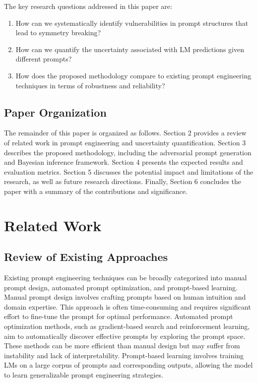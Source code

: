 \documentclass{article}
\begin{document}
The key research questions addressed in this paper are:

\begin{enumerate}
    \item How can we systematically identify vulnerabilities in prompt structures that lead to symmetry breaking?
    \item How can we quantify the uncertainty associated with LM predictions given different prompts?
    \item How does the proposed methodology compare to existing prompt engineering techniques in terms of robustness and reliability?
\end{enumerate}

\subsection{Paper Organization}
The remainder of this paper is organized as follows. Section 2 provides a review of related work in prompt engineering and uncertainty quantification. Section 3 describes the proposed methodology, including the adversarial prompt generation and Bayesian inference framework. Section 4 presents the expected results and evaluation metrics. Section 5 discusses the potential impact and limitations of the research, as well as future research directions. Finally, Section 6 concludes the paper with a summary of the contributions and significance.

\section{Related Work}

\subsection{Review of Existing Approaches}
Existing prompt engineering techniques can be broadly categorized into manual prompt design, automated prompt optimization, and prompt-based learning. Manual prompt design involves crafting prompts based on human intuition and domain expertise. This approach is often time-consuming and requires significant effort to fine-tune the prompt for optimal performance. Automated prompt optimization methods, such as gradient-based search and reinforcement learning, aim to automatically discover effective prompts by exploring the prompt space. These methods can be more efficient than manual design but may suffer from instability and lack of interpretability. Prompt-based learning involves training LMs on a large corpus of prompts and corresponding outputs, allowing the model to learn generalizable prompt engineering strategies.
\end{document}
